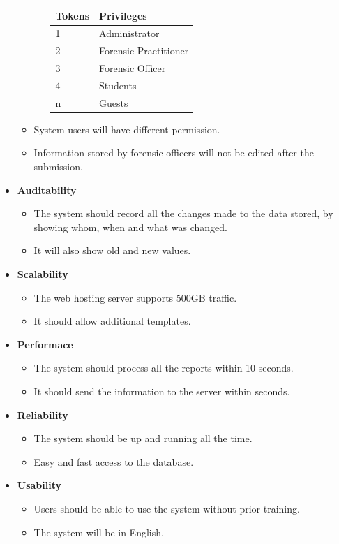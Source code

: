 \documentclass[10pt,a4paper]{article}
\begin{document}
\begin{itemize}
\begin{itemize}
\begin{itemize}
\begin{tabular}{|l|l|}
				Tokens   & Privileges	\\\hline
				1	& Administrator	\\\hline
				2	& Forensic Practitioner \\\hline
				3	& Forensic Officer \\\hline
				4	& Students	\\\hline
				n	& Guests	\\\hline
			\end{tabular}
		\end{itemize}
	\item System users will have different permission.
	\item Information stored by forensic officers will not be edited after the submission.
\end{itemize}
\item\textbf{Auditability}         
\begin{itemize}
	\item The system should record all the changes made to the data stored, by showing whom, when and what was changed.
	\item It will also show old and new values.
\end{itemize}
\item\textbf{Scalability}
\begin{itemize}
	\item The web hosting server supports 500GB traffic.
	\item It should allow additional templates.
\end{itemize}

\item\textbf{Performace}
\begin{itemize}
	\item The system should process all the reports within 10 seconds.
	\item It should send the information to the server within seconds.
\end{itemize}
               
\item\textbf{Reliability}
  \begin{itemize}
  	\item The system should be up and running all the time.
  	\item Easy and fast access to the database.
  \end{itemize}

\item\textbf{Usability}
\begin{itemize}
     \item Users should be able to use the system without prior
      training.                                                       \item The system will be in English.   
 \end{itemize}
 

\end{itemize}
\end{document}
